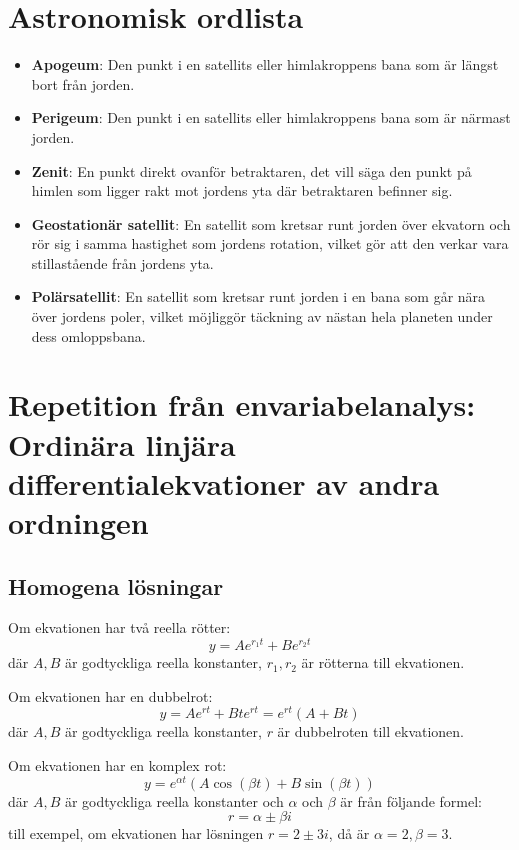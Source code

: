 \documentclass{article}
\newenvironment{ankiflashcard}[1]{}{}
\begin{document}
\begin{appendix}
\appendixpage
\section{Astronomisk ordlista}
\begin{itemize}
    \item \textbf{Apogeum}: Den punkt i en satellits eller himlakroppens bana som är längst bort från jorden.
    \item \textbf{Perigeum}: Den punkt i en satellits eller himlakroppens bana som är närmast jorden.
    \item \textbf{Zenit}: En punkt direkt ovanför betraktaren, det vill säga den punkt på himlen som ligger rakt mot jordens yta där betraktaren befinner sig.
    \item \textbf{Geostationär satellit}: En satellit som kretsar runt jorden över ekvatorn och rör sig i samma hastighet som jordens rotation, vilket gör att den verkar vara stillastående från jordens yta.
    \item \textbf{Polärsatellit}: En satellit som kretsar runt jorden i en bana som går nära över jordens poler, vilket möjliggör täckning av nästan hela planeten under dess omloppsbana.
\end{itemize}
\begin{ankiflashcard}{Repetera envariabeln: ange lösningarna till en typisk andra ordningens linjär homogen differentialekvation med konstanta koefficienter.}
\section*{Repetition från envariabelanalys: Ordinära linjära differentialekvationer av andra ordningen}

\subsection*{Homogena lösningar}

Om ekvationen har två reella rötter:
$$
y = Ae^{r_1t} + Be^{r_2t}
$$
där \( A, B \) är godtyckliga reella konstanter, \( r_1, r_2 \) är rötterna till ekvationen.

Om ekvationen har en dubbelrot:
$$
y = Ae^{rt} + Bte^{rt} = e^{rt}(A + Bt)
$$
där \( A, B \) är godtyckliga reella konstanter, \( r \) är dubbelroten till ekvationen.

Om ekvationen har en komplex rot:
$$
y = e^{\alpha t}(A\cos(\beta t) + B\sin(\beta t))
$$
där \( A, B \) är godtyckliga reella konstanter och \( \alpha \) och \( \beta \) är från följande formel:
$$
r = \alpha \pm \beta i
$$
till exempel, om ekvationen har lösningen \( r = 2 \pm 3i \), då är \( \alpha = 2, \beta = 3 \).


\end{ankiflashcard}
\end{appendix}
\end{document}
